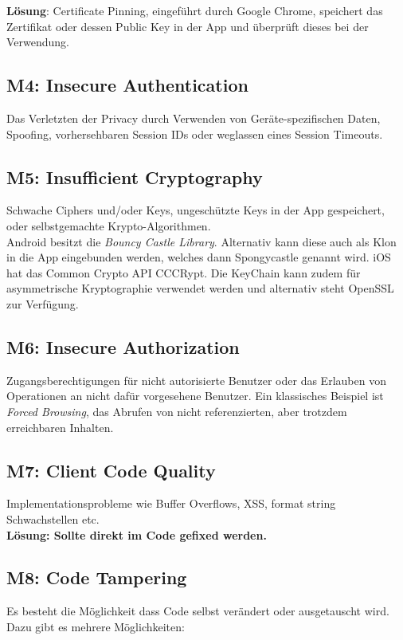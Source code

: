\textbf{Lösung}: Certificate Pinning, eingeführt durch Google Chrome, speichert das Zertifikat oder dessen Public Key in der App und überprüft dieses bei der Verwendung.

\subsection{M4: Insecure Authentication}
Das Verletzten der Privacy durch Verwenden von Geräte-spezifischen Daten, Spoofing, vorhersehbaren Session IDs oder weglassen eines Session Timeouts.

\subsection{M5: Insufficient Cryptography}
Schwache Ciphers und/oder Keys, ungeschützte Keys in der App gespeichert, oder selbstgemachte Krypto-Algorithmen.\\

Android besitzt die \textit{Bouncy Castle Library}. Alternativ kann diese auch als Klon in die App eingebunden werden, welches dann Spongycastle genannt wird. iOS hat das Common Crypto API CCCRypt. Die KeyChain kann zudem für asymmetrische Kryptographie verwendet werden und alternativ steht OpenSSL zur Verfügung.

\subsection{M6: Insecure Authorization}
Zugangsberechtigungen für nicht autorisierte Benutzer oder das Erlauben von Operationen an nicht dafür vorgesehene Benutzer. Ein klassisches Beispiel ist \textit{Forced Browsing}, das Abrufen von nicht referenzierten, aber trotzdem erreichbaren Inhalten.

\subsection{M7: Client Code Quality}
Implementationsprobleme wie Buffer Overflows, XSS, format string Schwachstellen etc.\\
\textbf{Lösung: Sollte direkt im Code gefixed werden.}

\subsection{M8: Code Tampering}
Es besteht die Möglichkeit dass Code selbst verändert oder ausgetauscht wird. Dazu gibt es mehrere Möglichkeiten:

